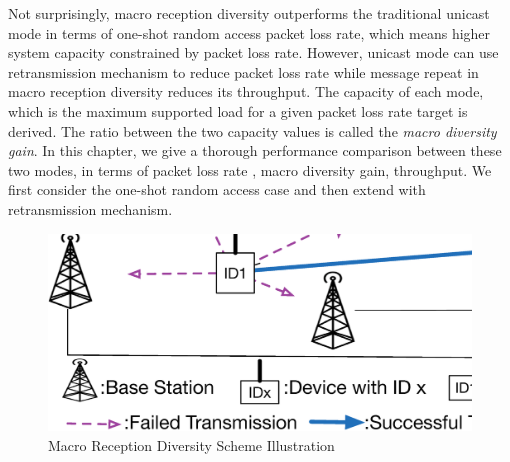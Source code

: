 Not surprisingly, macro reception diversity outperforms the traditional unicast mode in terms of one-shot random access packet loss rate, which means higher system capacity constrained by packet loss rate. However, unicast mode can use retransmission mechanism to reduce packet loss rate while message repeat in macro reception diversity reduces its throughput. The capacity of each mode, which is the maximum supported load for a given packet loss rate target is derived. The ratio between the two capacity values is called the \emph{macro diversity gain}. In this chapter, we give a thorough performance comparison between these two modes, in terms of packet loss rate , macro diversity gain, throughput. We first consider the one-shot random access case and then extend with retransmission mechanism.

\begin{figure}[!ht]
	\centering
	\includegraphics[width=\linewidth]{Chapter5/Figures/Macro_Diversity_Recpetion_Illustration}
	\caption{Macro Reception Diversity Scheme Illustration}
	\label{fig:macro_diversity_recpetion_illustration}
\end{figure} 

